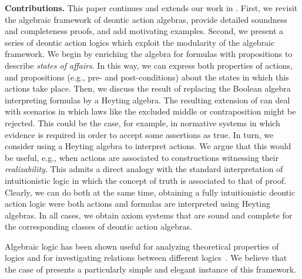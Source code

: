 \medskip\noindent
\textbf{Contributions.} %
This paper continues and extends our work in \cite{CCFA:2021}. First, we revisit the algebraic framework of deontic action algebras, provide detailed soundness and completeness proofs, and add motivating examples. 
Second, we present a series of deontic action logics which exploit the modularity of the algebraic framework.
We begin by enriching the algebra for formulas with propositions to describe \emph{states of affairs}.  In this way, we can express both properties of actions, and propositions (e.g., pre- and post-conditions) about the states in which this actions take place. 
Then, we discuss the result of replacing the Boolean algebra interpreting formulas by a Heyting algebra.
The resulting extension of \DAL can deal with scenarios in which laws like the excluded middle or contraposition might be rejected.
This could be the case, for example, in normative systems in which evidence is required in order to accept some assertions as true.
In turn,  we consider using a Heyting algebra to interpret actions. We argue that this would be useful, e.g., when actions are associated to constructions witnessing their \emph{realizability}.
This admits a direct analogy with the standard interpretation of intuitionistic logic in which the concept of truth is associated to that of proof.
Clearly, we can do both at the same time, obtaining a fully intuitionistic deontic action logic were both actions and formulas are interpreted using Heyting algebras. 
In all cases, we obtain axiom systems that are sound and complete for the corresponding classes of deontic action algebras.

Algebraic logic has been shown useful for analyzing theoretical properties of logics and for investigating relations between different logics~\cite{ras1963,Andreka1991-ANDAL-2}. We believe that the case of \DAL presents a particularly simple and elegant instance of this framework. 


